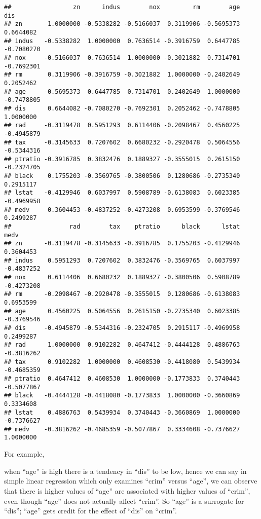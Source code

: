 \documentclass[]{article}
\begin{document}
\begin{verbatim}
##                 zn      indus        nox         rm        age        dis
## zn       1.0000000 -0.5338282 -0.5166037  0.3119906 -0.5695373  0.6644082
## indus   -0.5338282  1.0000000  0.7636514 -0.3916759  0.6447785 -0.7080270
## nox     -0.5166037  0.7636514  1.0000000 -0.3021882  0.7314701 -0.7692301
## rm       0.3119906 -0.3916759 -0.3021882  1.0000000 -0.2402649  0.2052462
## age     -0.5695373  0.6447785  0.7314701 -0.2402649  1.0000000 -0.7478805
## dis      0.6644082 -0.7080270 -0.7692301  0.2052462 -0.7478805  1.0000000
## rad     -0.3119478  0.5951293  0.6114406 -0.2098467  0.4560225 -0.4945879
## tax     -0.3145633  0.7207602  0.6680232 -0.2920478  0.5064556 -0.5344316
## ptratio -0.3916785  0.3832476  0.1889327 -0.3555015  0.2615150 -0.2324705
## black    0.1755203 -0.3569765 -0.3800506  0.1280686 -0.2735340  0.2915117
## lstat   -0.4129946  0.6037997  0.5908789 -0.6138083  0.6023385 -0.4969958
## medv     0.3604453 -0.4837252 -0.4273208  0.6953599 -0.3769546  0.2499287
##                rad        tax    ptratio      black      lstat       medv
## zn      -0.3119478 -0.3145633 -0.3916785  0.1755203 -0.4129946  0.3604453
## indus    0.5951293  0.7207602  0.3832476 -0.3569765  0.6037997 -0.4837252
## nox      0.6114406  0.6680232  0.1889327 -0.3800506  0.5908789 -0.4273208
## rm      -0.2098467 -0.2920478 -0.3555015  0.1280686 -0.6138083  0.6953599
## age      0.4560225  0.5064556  0.2615150 -0.2735340  0.6023385 -0.3769546
## dis     -0.4945879 -0.5344316 -0.2324705  0.2915117 -0.4969958  0.2499287
## rad      1.0000000  0.9102282  0.4647412 -0.4444128  0.4886763 -0.3816262
## tax      0.9102282  1.0000000  0.4608530 -0.4418080  0.5439934 -0.4685359
## ptratio  0.4647412  0.4608530  1.0000000 -0.1773833  0.3740443 -0.5077867
## black   -0.4444128 -0.4418080 -0.1773833  1.0000000 -0.3660869  0.3334608
## lstat    0.4886763  0.5439934  0.3740443 -0.3660869  1.0000000 -0.7376627
## medv    -0.3816262 -0.4685359 -0.5077867  0.3334608 -0.7376627  1.0000000
\end{verbatim}

For example,

when ``age'' is high there is a tendency in ``dis'' to be low, hence we
can say in simple linear regression which only examines ``crim'' versus
``age'', we can observe that there is higher values of ``age'' are
associated with higher values of ``crim'', even though ``age'' does not
actually affect ``crim''. So ``age'' is a surrogate for ``dis''; ``age''
gets credit for the effect of ``dis'' on ``crim''.
\end{document}
